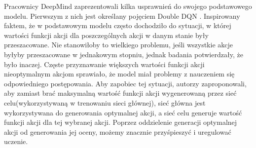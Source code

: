 \documentclass[preprint,12pt]{elsarticle}
\begin{document}
Pracownicy DeepMind zaprezentowali kilka usprawnień do swojego podstawowego modelu. Pierwszym z nich jest określany pojęciem Double DQN \cite{DoubleDQN:2015}. Inspirowany faktem, że w podstawowym modelu często dochodziło do sytuacji, w której wartości funkcji akcji dla poszczególnych akcji w danym stanie były przeszacowane. Nie stanowiłoby to wielkiego problemu, jeśli wszystkie akcje byłyby przeszacowane w jednakowym stopniu, jednak badania potwierdzały, że było inaczej. Częste przyznawanie większych wartości funkcji akcji nieoptymalnym akcjom sprawiało, że model miał problemy z nauczeniem się odpowiedniego postępowania. Aby zapobiec tej sytuacji, autorzy zaproponowali, aby zamiast brać maksymalną wartość funkcji akcji wygenerowaną przez sieć celu(wykorzystywaną w trenowaniu sieci głównej), sieć główna jest wykorzystywana do generowania optymalnej akcji, a sieć celu generuje wartość funkcji akcji dla tej wybranej akcji. Poprzez oddzielenie generacji optymalnej akcji od generowania jej oceny, możemy znacznie przyśpieszyć i uregulować uczenie.
\end{document}
